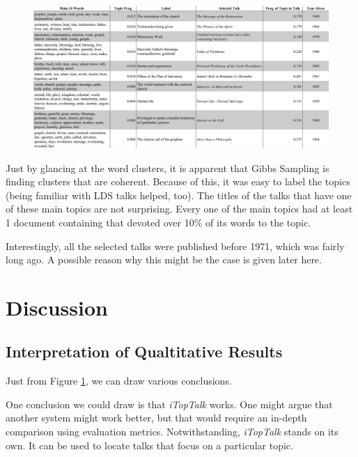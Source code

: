 \begin{landscape}
    \begin{figure}[ht!]
        \centering
        \includegraphics[width=230mm]{output.png}
        \label{figure:topics_labels}
    \end{figure}

\end{landscape}

Just by glancing at the word clusters, it is apparent that Gibbs Sampling is finding clusters that are coherent. Because of this, it was easy to label the topics (being familiar with LDS talks helped, too). The titles of the talks that have one of these main topics are not surprising. Every one of the main topics had at least 1 document containing that devoted over 10\% of its words to the topic.

Interestingly, all the selected talks were published before 1971, which was fairly long ago. A possible reason why this might be the case is given later here.


\section{Discussion}

\subsection{Interpretation of Qualtitative Results}
Just from Figure \ref{figure:topics_labels}, we can draw various conclusions. 

One conclusion we could draw is that \emph{iTopTalk} works. One might argue that another system might work better, but that would require an in-depth comparison using evaluation metrics. Notwithstanding, \emph{iTopTalk} stands on its own. It can be used to locate talks that focus on a particular topic. 

